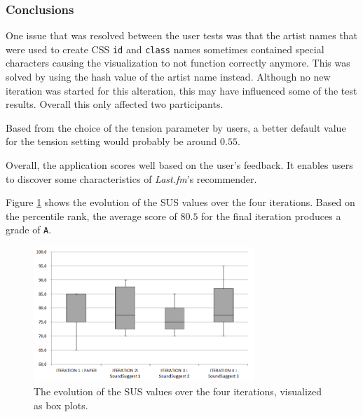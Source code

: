 

\subsubsection{Conclusions}\label{chapter:prototype:section:soundsuggest3:conclusion}

One issue that was resolved between the user tests was that the artist names that were used to create CSS \texttt{id} and \texttt{class} names sometimes contained special characters causing the visualization to not function correctly anymore. This was solved by using the hash value of the artist name instead. Although no new iteration was started for this alteration, this may have influenced some of the test results. Overall this only affected two participants.

Based from the choice of the tension parameter by users, a better default value for the tension setting would probably be around $0.55$.



Overall, the application scores well based on the user's feedback. It enables users to discover some characteristics of \emph{Last.fm}'s recommender.

Figure \ref{fig:iterations_sus_scores_boxplots} shows the evolution of the SUS values over the four iterations. Based on the percentile rank, the average score of $80.5$ for the final iteration produces a grade of \texttt{A}.

\begin{figure}
	\begin{center}
		\includegraphics[width=8.3cm]{img/iterations_sus_scores_boxplots}
	\end{center}
	\caption{The evolution of the SUS values over the four iterations, visualized as box plots.}
	\label{fig:iterations_sus_scores_boxplots}
\end{figure}



